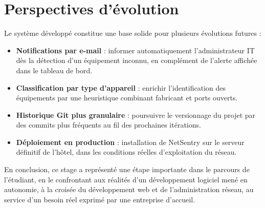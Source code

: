 \section{Perspectives d'évolution}

Le système développé constitue une base solide pour plusieurs évolutions futures :

\begin{itemize}
    \item \textbf{Notifications par e-mail} : informer automatiquement l'administrateur
    IT dès la détection d'un équipement inconnu, en complément de l'alerte affichée dans
    le tableau de bord.
    \item \textbf{Classification par type d'appareil} : enrichir l'identification des
    équipements par une heuristique combinant fabricant et ports ouverts.
    \item \textbf{Historique Git plus granulaire} : poursuivre le versionnage du projet
    par des commits plus fréquents au fil des prochaines itérations.
    \item \textbf{Déploiement en production} : installation de NetSentry sur le serveur
    définitif de l'hôtel, dans les conditions réelles d'exploitation du réseau.
\end{itemize}

En conclusion, ce stage a représenté une étape importante dans le parcours de
l'étudiant, en le confrontant aux réalités d'un développement logiciel mené en
autonomie, à la croisée du développement web et de l'administration réseau, au service
d'un besoin réel exprimé par une entreprise d'accueil.
